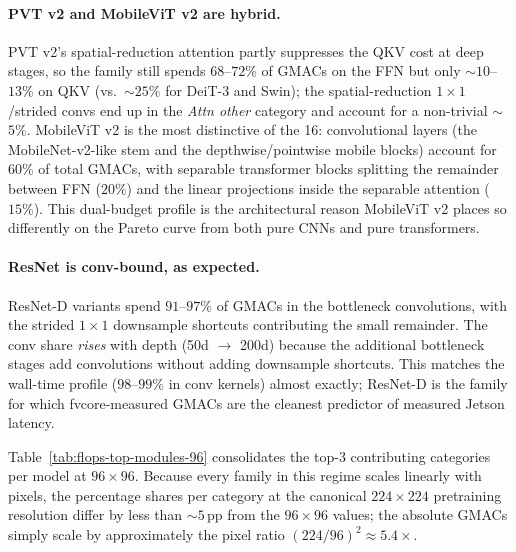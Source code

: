 \documentclass[runningheads,a4paper]{llncs}
\begin{document}
\paragraph{PVT v2 and MobileViT v2 are hybrid.}
PVT v2's spatial-reduction attention partly suppresses the QKV cost at deep stages, so the family still spends $68$--$72\%$ of GMACs on the FFN but only $\sim$$10$--$13\%$ on QKV (vs.\ $\sim$$25\%$ for DeiT-3 and Swin); the spatial-reduction $1\times1$/strided convs end up in the \emph{Attn other} category and account for a non-trivial $\sim$$5\%$. MobileViT v2 is the most distinctive of the 16: convolutional layers (the MobileNet-v2-like stem and the depthwise/pointwise mobile blocks) account for $60\%$ of total GMACs, with separable transformer blocks splitting the remainder between FFN ($20\%$) and the linear projections inside the separable attention ($15\%$). This dual-budget profile is the architectural reason MobileViT v2 places so differently on the Pareto curve from both pure CNNs and pure transformers.

\paragraph{ResNet is conv-bound, as expected.}
ResNet-D variants spend $91$--$97\%$ of GMACs in the bottleneck convolutions, with the strided $1\times1$ downsample shortcuts contributing the small remainder. The conv share \emph{rises} with depth (50d $\to$ 200d) because the additional bottleneck stages add convolutions without adding downsample shortcuts. This matches the wall-time profile ($98$--$99\%$ in conv kernels) almost exactly; ResNet-D is the family for which fvcore-measured GMACs are the cleanest predictor of measured Jetson latency.

\begin{table}[!htbp]
    \centering
    \caption{Top-3 per-module GMACs contributors at the $96\times96$ TinyFace deployment resolution. ``GMACs'' is the total backbone cost at batch=1; percentages give each category's share of that total. ``FFN / MLP'' includes the inverted-bottleneck $1\times1$ projection stack for ConvNeXt; ``Attn other'' for PVT v2 captures the spatial-reduction projections inside the attention block.}
    \label{tab:flops-top-modules-96}
    \scriptsize
    
\end{table}

Table~\ref{tab:flops-top-modules-96} consolidates the top-3 contributing categories per model at $96\times96$. Because every family in this regime scales linearly with pixels, the percentage shares per category at the canonical $224\times224$ pretraining resolution differ by less than $\sim$$5$\,pp from the $96\times96$ values; the absolute GMACs simply scale by approximately the pixel ratio $(224/96)^2 \approx 5.4\times$.
\end{document}
